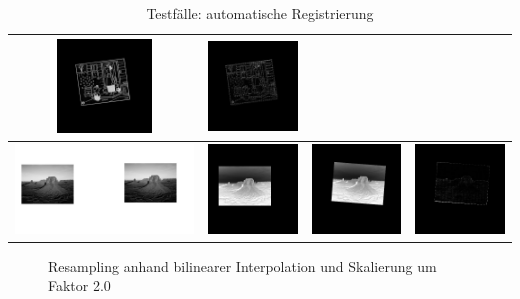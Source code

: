 \documentclass[12pt,german]{article}
\begin{document}
\begin{table}[H]
\begin{tabular}{| c | c | c | c |}
    \includegraphics[width=2.5cm]{images/autoregister/binary2SH.jpg} &
    \includegraphics[width=2.5cm]{images/autoregister/binary2DIFF.jpg} \\
    \hline
    \includegraphics[width=5cm]{images/autoregister/gray2.jpg} &
    \includegraphics[width=2.5cm]{images/autoregister/gray1FH.jpg} &
    \includegraphics[width=2.5cm]{images/autoregister/gray1SH.jpg} &
    \includegraphics[width=2.5cm]{images/autoregister/gray1DIFF.jpg} \\
    \hline
    
  \end{tabular}
  \caption{Testfälle: automatische Registrierung}
  \label{tab:autoRegisterTest}
\end{table}


\newpage


\begin{figure}[H]
	\centering
	\caption{Resampling anhand bilinearer Interpolation und Skalierung um Faktor 2.0}
	\label{fig:resultResamplingBilinearInterpolation-2.0}
\end{figure}




\newpage
\end{document}
